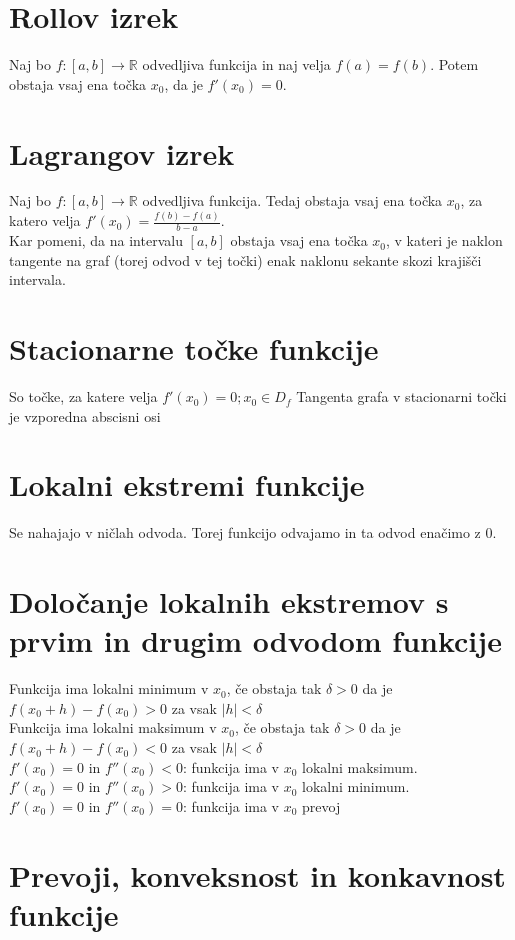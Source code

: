 \documentclass[12pt]{report}
\newcommand{\R}{\mathbb{R}}
\begin{document}
\section*{Rollov izrek}
Naj bo $f: [a,b] \to \R$ odvedljiva funkcija in naj velja $f(a) = f(b)$. Potem obstaja vsaj ena točka $x_0$, da je $f'(x_0) = 0$.

\section*{Lagrangov izrek}
Naj bo $f: [a,b] \to \R$ odvedljiva funkcija. Tedaj obstaja vsaj ena točka $x_0$, za katero velja $f'(x_0)=\frac{f(b) - f(a)}{b - a}$.\\
Kar pomeni, da na intervalu $[a,b]$ obstaja vsaj ena točka $x_0$, v kateri je naklon tangente na graf (torej odvod v tej točki) enak naklonu sekante skozi krajišči  intervala.

\section*{Stacionarne točke funkcije}
So točke, za katere velja $f'(x_0)=0; x_0 \in D_f$
Tangenta grafa v stacionarni točki je vzporedna abscisni osi

\section*{Lokalni ekstremi funkcije}

Se nahajajo v ničlah odvoda. Torej funkcijo odvajamo in ta odvod enačimo z 0.

\section*{Določanje lokalnih ekstremov s prvim in drugim odvodom funkcije}
Funkcija ima lokalni minimum v $x_0$, če obstaja tak $\delta>0$ da je $f(x_0+h)-f(x_0)>0$ za vsak $|h|<\delta$\\
Funkcija ima lokalni maksimum v $x_0$, če obstaja tak $\delta>0$ da je $f(x_0+h)-f(x_0)<0$ za vsak $|h|<\delta$\\
\bigbreak
$f'(x_0) = 0$ in $f''(x_0) < 0$: funkcija ima v $x_0$ lokalni maksimum.\\
$f'(x_0) = 0$ in $f''(x_0) > 0$: funkcija ima v $x_0$ lokalni minimum.\\
$f'(x_0) = 0$ in $f''(x_0) = 0$: funkcija ima v $x_0$ prevoj\\

\section*{Prevoji, konveksnost in konkavnost funkcije}
\end{document}
